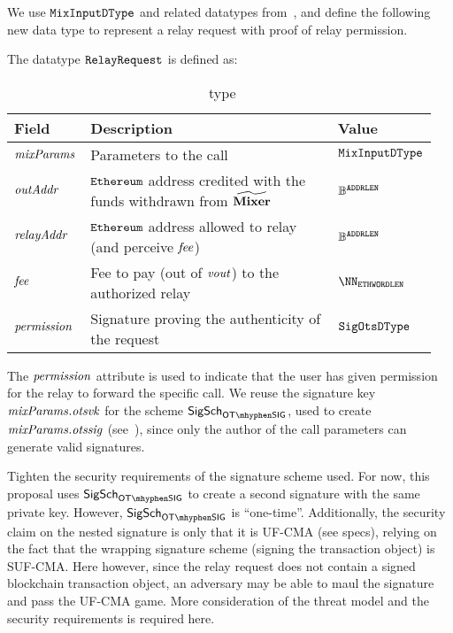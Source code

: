 We use ${\mathtt{MixInputDType}}$ and related datatypes from~\cite[Section 2.1]{zeth-protocol}, and define the following new data type to represent a relay request with proof of relay permission.

\begin{definition}\label{protocol:datatypes:relayrequest}
  The datatype ${\mathtt{RelayRequest}}$ is defined as:
  \begin{table}[H]
    \centering
    \begin{tabular}{p{0.15\linewidth} | p{0.6\linewidth} | p{0.2\linewidth}}
      Field & Description & Value\\ \toprule

      $\mathit{mixParams}$ &
      Parameters to the \mix{} call &
      ${\mathtt{MixInputDType}}$ \\ \midrule

      $\mathit{outAddr}$ &
      $\texttt{Ethereum}$ address credited with the funds withdrawn from $\widetilde{\mathbf{Mixer}}$ &
      $\mathbb{B}^{\mathtt{ADDRLEN}}$ \\ \midrule

      $\mathit{relayAddr}$ &
      $\texttt{Ethereum}$ address allowed to relay \mixparams{} (and perceive $\mathit{fee}$) &
      $\mathbb{B}^{\mathtt{ADDRLEN}}$ \\ \midrule

      $\mathit{fee}$ &
      Fee to pay (out of $\mathit{vout}$) to the authorized relay &
      $\NN_{\ethWordLen}$ \\ \midrule

      $\mathit{permission}$ &
      Signature proving the authenticity of the request &
      ${\mathtt{SigOtsDType}}$ \\ \bottomrule
    \end{tabular}
    \caption{\relayRequestDType~type}
  \end{table}
\end{definition}

The $\mathit{permission}$ attribute is used to indicate that the user has given permission for the relay to forward the specific \mix{} call. We reuse the signature key $\mathit{mixParams}.\mathit{otsvk}$ for the scheme $\sigscheme_{\otsig}$, used to create $\mathit{mixParams}.\mathit{otssig}$ (see~\cite[Section 2.3]{zeth-protocol}), since only the author of the \mix{} call parameters can generate valid signatures.

\begin{todobox}
    Tighten the security requirements of the signature scheme used.
    For now, this proposal uses $\sigscheme_{\otsig}$ to create a second signature with the same private key.  However, $\sigscheme_{\otsig}$ is ``one-time''.
    Additionally, the security claim on the nested signature is only that it is UF-CMA (see specs), relying on the fact that the wrapping signature scheme (signing the transaction object) is SUF-CMA. Here however, since the relay request does not contain a signed blockchain transaction object, an adversary may be able to maul the signature and pass the UF-CMA game. More consideration of the threat model and the security requirements is required here.
\end{todobox}

